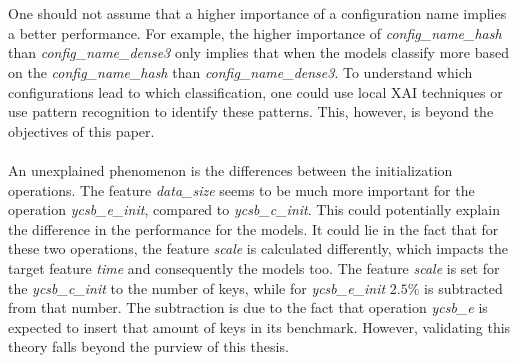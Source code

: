 \\\\
One should not assume that a higher importance of a configuration name implies a better performance. For example, the higher importance of \textit{config\_name\_hash} than \textit{config\_name\_dense3} only implies that when the models classify more based on the \textit{config\_name\_hash} than \textit{config\_name\_dense3}. To understand which configurations lead to which classification, one could use local \ac{XAI} techniques or use pattern recognition to identify these patterns. This, however, is beyond the objectives of this paper. 
\\\\
An unexplained phenomenon is the differences between the initialization operations. The feature \textit{data\_size} seems to be much more important for the operation \textit{ycsb\_e\_init}, compared to \textit{ycsb\_c\_init}. This could potentially explain the difference in the performance for the models. It could lie in the fact that for these two operations, the feature \textit{scale} is calculated differently, which impacts the target feature \textit{time} and consequently the models too. The feature \textit{scale} is set for the \textit{ycsb\_c\_init} to the number of keys, while for \textit{ycsb\_e\_init} $2.5\%$ is subtracted from that number. The subtraction is due to the fact that operation \textit{ycsb\_e} is expected to insert that amount of keys in its benchmark. However, validating this theory falls beyond the purview of this thesis.

